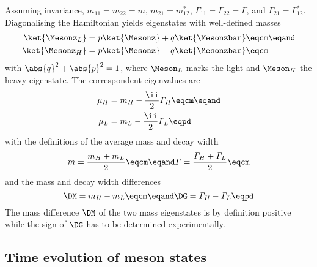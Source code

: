 Assuming \CPT invariance, $m_{11} = m_{22} = m$, $m_{21} = m_{12}^{\ast}$,
$\mathit{\Gamma}_{11} = \mathit{\Gamma}_{22} = \mathit{\Gamma}$, and
$\mathit{\Gamma}_{21} = \mathit{\Gamma}_{12}^{\ast}$. Diagonalising the
Hamiltonian yields eigenstates with well-defined masses
%
\begin{equation}\label{eq:cpv_theory:flavour_physics:bmixing:mass_eigenstates}
  \begin{split}
    \ket{\Mesonz_L} &= p \ket{\Mesonz} + q \ket{\Mesonzbar}\eqcm\eqand \\
    \ket{\Mesonz_H} &= p \ket{\Mesonz} - q \ket{\Mesonzbar}\eqcm
  \end{split}
\end{equation}
%
with $\abs{q}^2 + \abs{p}^2 = 1$, where $\Meson_L$ marks the light and
$\Meson_H$ the heavy eigenstate. The correspondent eigenvalues are
%
\begin{equation}
  \begin{split}
    \mu_H &= m_H - \frac{\ii}{2} \mathit{\Gamma}_H\eqcm\eqand \\
    \mu_L &= m_L - \frac{\ii}{2} \mathit{\Gamma}_L\eqpd
  \end{split}
\end{equation}
%
with the definitions of the average mass and decay width
%
\begin{equation}
  m = \frac{m_H + m_L}{2} \eqcm \eqand \mathit{\Gamma} = \frac{\mathit{\Gamma}_H + \mathit{\Gamma}_L}{2}\eqcm
\end{equation}
%
and the mass and decay width differences
%
\begin{equation}
  \DM = m_H - m_L \eqcm \eqand \DG = \mathit{\Gamma}_H - \mathit{\Gamma}_L\eqpd
\end{equation}
%
The mass difference $\DM$ of the two mass eigenstates is by definition positive
while the sign of $\DG$ has to be determined experimentally.

\subsection{Time evolution of meson states}
\label{sec:cpv_theory:flavour_physics:time_evolution}

